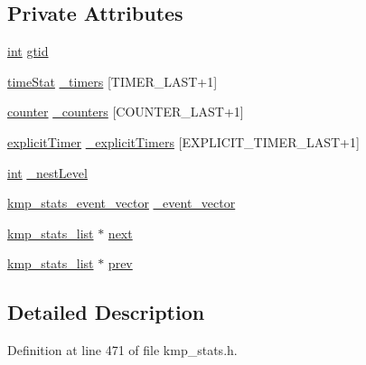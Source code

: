 \subsection*{Private Attributes}
\begin{DoxyCompactItemize}
\item 
\hyperlink{ittnotify__static_8h_a8b8dcd723308a8cb5d84277c7a3fff70}{int} \hyperlink{classkmp__stats__list_a18c3971024dbebaaeb981747c0bfa34a}{gtid}
\item 
\hyperlink{classtimeStat}{time\-Stat} \hyperlink{classkmp__stats__list_a2624345c5644d6c9e463ab997f99de8f}{\-\_\-timers} \mbox{[}T\-I\-M\-E\-R\-\_\-\-L\-A\-S\-T+1\mbox{]}
\item 
\hyperlink{classcounter}{counter} \hyperlink{classkmp__stats__list_a8635a47fbc09bf2a54af3784f72a916b}{\-\_\-counters} \mbox{[}C\-O\-U\-N\-T\-E\-R\-\_\-\-L\-A\-S\-T+1\mbox{]}
\item 
\hyperlink{classexplicitTimer}{explicit\-Timer} \hyperlink{classkmp__stats__list_ad71602833e5b424a719a0e02a28be197}{\-\_\-explicit\-Timers} \mbox{[}E\-X\-P\-L\-I\-C\-I\-T\-\_\-\-T\-I\-M\-E\-R\-\_\-\-L\-A\-S\-T+1\mbox{]}
\item 
\hyperlink{ittnotify__static_8h_a8b8dcd723308a8cb5d84277c7a3fff70}{int} \hyperlink{classkmp__stats__list_a140b3c1a52365bc70ab33ae8faacb5b1}{\-\_\-nest\-Level}
\item 
\hyperlink{classkmp__stats__event__vector}{kmp\-\_\-stats\-\_\-event\-\_\-vector} \hyperlink{classkmp__stats__list_abaddd69e62be5eb0b2e2e6dd4a514c92}{\-\_\-event\-\_\-vector}
\item 
\hyperlink{classkmp__stats__list}{kmp\-\_\-stats\-\_\-list} $\ast$ \hyperlink{classkmp__stats__list_ae032b64486b967b266e1c524f993995e}{next}
\item 
\hyperlink{classkmp__stats__list}{kmp\-\_\-stats\-\_\-list} $\ast$ \hyperlink{classkmp__stats__list_a247f44ee360e3e51e4c48ce3fe2372cd}{prev}
\end{DoxyCompactItemize}


\subsection{Detailed Description}


Definition at line 471 of file kmp\-\_\-stats.\-h.



